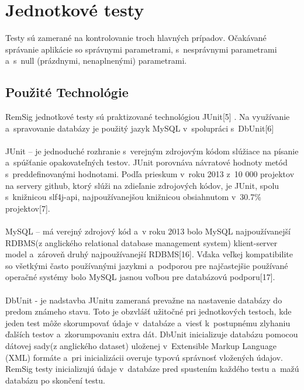 \documentclass[
  printed, %
  notable,   %
  nolof,     %
    oneside,       %
  nolot,     %
]{fithesis3}
\begin{document}
\section{Jednotkové testy}
Testy sú zamerané na kontrolovanie troch hlavných prípadov. Očakávané správanie aplikácie so správnymi parametrami, s~nesprávnymi parametrami a~s~null (prázdnymi, nenaplnenými) parametrami.
\subsection{Použité Technológie}
RemSig jednotkové testy sú praktizované technológiou  JUnit[5] . Na využívanie a~spravovanie databázy je použitý jazyk MySQL v~spolupráci s~DbUnit[6]\paragraph{}
JUnit – je jednoduché rozhranie s~verejným zdrojovým kódom slúžiace na písanie a~spúšťanie opakovateľných testov. JUnit porovnáva návratové hodnoty metód s~preddefinovanými hodnotami. Podľa prieskum v~roku 2013 z~10 000 projektov na servery github, ktorý slúži na zdieľanie zdrojových kódov, je JUnit, spolu s~knižnicou slf4j-api, najpoužívanejšou knižnicou obsiahnutom v~30.7\% projektov[7]. \paragraph{}
MySQL – má verejný zdrojový kód a~v roku 2013 bolo MySQL najpoužívanejší RDBMS(z anglického relational database management system) klient-server model a~zároveň druhý najpoužívanejší RDBMS[16]. Vďaka veľkej kompatibilite so všetkými často používanými jazykmi a~podporou pre najčastejšie používané operačné systémy bolo MySQL jasnou voľbou pre databázovú podporu[17].\paragraph{}
DbUnit -  je nadstavba JUnitu zameraná prevažne na nastavenie databázy do predom známeho stavu. Toto je obzvlášť užitočné pri jednotkových testoch, kde jeden test môže skorumpovať údaje v~databáze a~viesť k~postupnému zlyhaniu ďalších  testov a~zkorumpovaniu extra dát. DbUnit inicializuje databázu pomocou  dátovej sady(z anglického dataset) uloženej v~Extensible Markup Language (XML) formáte a~pri inicializácii overuje typovú správnosť vložených údajov. RemSig testy inicializujú údaje v~databáze pred  spustením  každého testu a~mažú databázu po skončení testu.  
\end{document}
